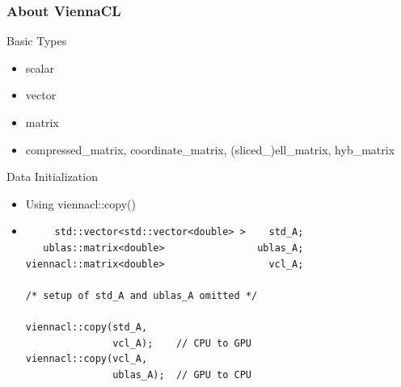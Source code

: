 \begin{frame}[fragile]
\frametitle{About ViennaCL}

 \begin{block}{Basic Types}
   \begin{itemize}
    \item scalar
    \item vector
    \item matrix
    \item compressed\_matrix, coordinate\_matrix, (sliced\_)ell\_matrix, hyb\_matrix
   \end{itemize}
 \end{block}

 \begin{block}{Data Initialization}
    \begin{itemize}
     \item Using viennacl::copy() 
    \item  { \black
  \begin{lstlisting}
     std::vector<std::vector<double> >    std_A;
   ublas::matrix<double>                ublas_A;
viennacl::matrix<double>                  vcl_A;

/* setup of std_A and ublas_A omitted */

viennacl::copy(std_A,
               vcl_A);    // CPU to GPU
viennacl::copy(vcl_A,
               ublas_A);  // GPU to CPU
  \end{lstlisting} }
 \end{itemize}

 \end{block}
\end{frame}



